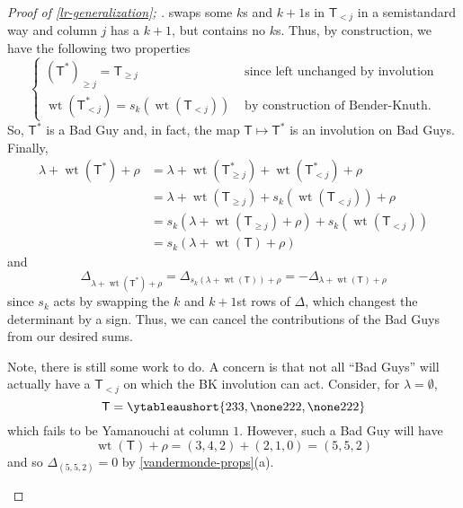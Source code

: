 \documentclass[11pt,leqno,oneside]{amsart}
\numberwithin{thm}{section}
\newcommand{\T}{\mathsf{T}} %
\newcommand{\Vdet}{\Delta}
\newcommand{\rowshift}{\rho}
\newcommand{\wt}{\operatorname{wt}}
\begin{document}
\begin{proof}[Proof of \ref{lr-generalization}; \cite{stembridge}]
  swaps some \(k\)s and \(k+1\)s in \(\T_{<j}\) in a semistandard way
  and column \(j\) has a \(k+1\), but contains no \(k\)s. Thus, by
  construction, we have the following two properties \[
    \begin{cases}
      (\T^*)_{\geq j} = \T_{\geq j} & \text{ since left unchanged by
        involution}\\
      \wt(\T^*_{< j}) = s_k(\wt(\T_{< j})) & \text{ by construction of
      Bender-Knuth.}
    \end{cases}
  \]
  So, \(\T^*\) is a Bad Guy and, in fact, the map \(\T \mapsto \T^*\)
  is an involution on Bad Guys. Finally,
  \begin{align*}
    \lambda+\wt(\T^*) + \rowshift
    & = \lambda + \wt(\T^*_{\geq j}) + \wt(\T^*_{<j}) + \rowshift\\
    & = \lambda + \wt(\T_{\geq j}) + s_k(\wt(\T_{<j})) + \rowshift\\
    & = s_k(\lambda+\wt(\T_{\geq j})+\rowshift) + s_k(\wt(\T_{<j}))\\
    & = s_k(\lambda+\wt(\T)+\rowshift)
  \end{align*}
  and \[
    \Vdet_{\lambda+\wt(\T^*)+\rowshift} =
    \Vdet_{s_k(\lambda+\wt(\T))+\rowshift} = 
    -\Vdet_{\lambda+\wt(\T)+\rowshift} 
  \]
  since \(s_k\) acts by swapping the \(k\) and \(k+1\)st rows of
  \(\Vdet\), which changest the determinant by a sign. Thus, we can
  cancel the contributions of the Bad Guys from our desired sums.
  \begin{rmk}\label{bad-guy-restrictions}
    Note, there is still some work to do. A concern is that not all
    ``Bad Guys'' will actually have a \(\T_{<j}\) on which the BK
    involution can act. Consider, for \(\lambda = \emptyset\), \[
      \T = \ytableaushort{233,\none222,\none222}
    \]
    which fails to be Yamanouchi at column \(1\). However, such a Bad
    Guy will have \[
      \wt(\T)+\rowshift = (3,4,2)+(2,1,0) = (5,5,2)
    \]
    and so \(\Vdet_{(5,5,2)} = 0\) by
    \ref{vandermonde-props}(a). 
  \end{rmk}
\end{proof}
\end{document}
